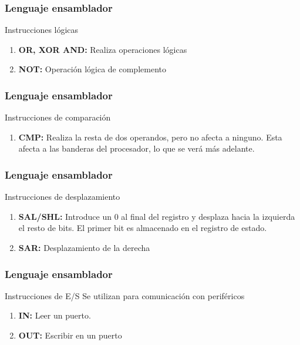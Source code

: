 \documentclass{beamer}
\begin{document}
\begin{frame}
	\frametitle{Lenguaje ensamblador}
	\begin{block}{Instrucciones lógicas}
		\begin{enumerate}
			\item \textbf{OR, XOR AND:} Realiza operaciones lógicas
			\item \textbf{NOT:} Operación lógica de complemento
		\end{enumerate}
	\end{block}
\end{frame}

\begin{frame}
	\frametitle{Lenguaje ensamblador}
	\begin{block}{Instrucciones de comparación}
		\begin{enumerate}
			\item \textbf{CMP:} Realiza la resta de dos operandos, pero no afecta a ninguno. Esta afecta a las banderas del procesador, lo que se verá más adelante.
		\end{enumerate}
	\end{block}
\end{frame}

\begin{frame}
	\frametitle{Lenguaje ensamblador}
	\begin{block}{Instrucciones de desplazamiento}
		\begin{enumerate}
			\item \textbf{SAL/SHL:} Introduce un 0 al final del registro y desplaza hacia la izquierda el resto de bits. El primer bit es almacenado en el registro de estado.
			\item \textbf{SAR:} Desplazamiento de la derecha
		\end{enumerate}
	\end{block}
\end{frame}

\begin{frame}
	\frametitle{Lenguaje ensamblador}
	\begin{block}{Instrucciones de E/S}
	Se utilizan para comunicación con periféricos
		\begin{enumerate}
			\item \textbf{IN:} Leer un puerto.
			\item \textbf{OUT:} Escribir en un puerto
		\end{enumerate}
	\end{block}
\end{frame}
\end{document}
